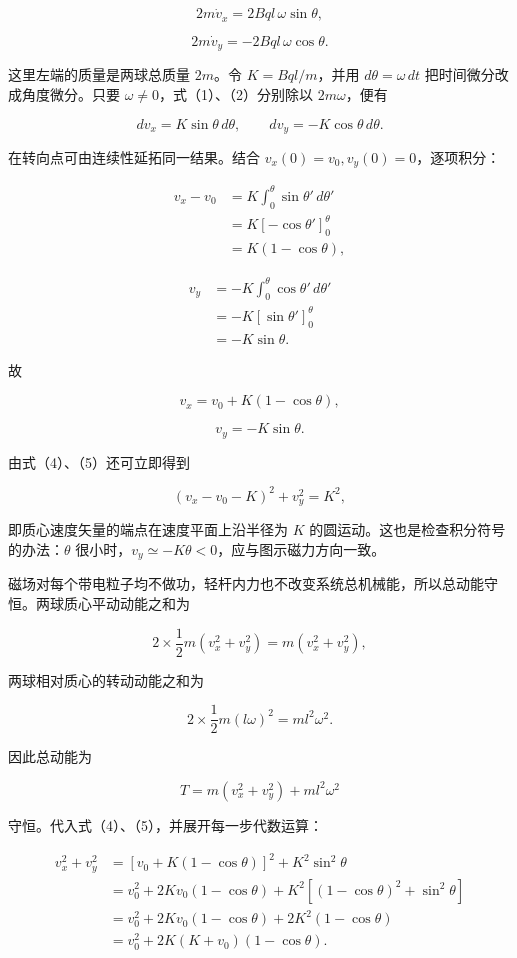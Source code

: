 \documentclass[12pt,a4paper,UTF8]{ctexart}
\begin{document}
\[
2m\dot v_x=2Bql\,\omega\sin\theta,
\tag{1}
\]

\[
2m\dot v_y=-2Bql\,\omega\cos\theta.
\tag{2}
\]

这里左端的质量是两球总质量 \(2m\)。令 \(K=Bql/m\)，并用
\(d\theta=\omega\,dt\) 把时间微分改成角度微分。只要
\(\omega\ne0\)，式（1）、（2）分别除以 \(2m\omega\)，便有

\[
dv_x=K\sin\theta\,d\theta,
\qquad
dv_y=-K\cos\theta\,d\theta.
\tag{3}
\]

在转向点可由连续性延拓同一结果。结合 \(v_x(0)=v_0,v_y(0)=0\)，逐项积分：

\[
\begin{aligned}
v_x-v_0
&=K\int_0^\theta\sin\theta'\,d\theta'\\
&=K[-\cos\theta']_0^\theta\\
&=K(1-\cos\theta),
\end{aligned}
\]

\[
\begin{aligned}
v_y
&=-K\int_0^\theta\cos\theta'\,d\theta'\\
&=-K[\sin\theta']_0^\theta\\
&=-K\sin\theta.
\end{aligned}
\]

故

\[
\boxed{v_x=v_0+K(1-\cos\theta)},
\tag{4}
\]

\[
\boxed{v_y=-K\sin\theta}.
\tag{5}
\]

由式（4）、（5）还可立即得到

\[
(v_x-v_0-K)^2+v_y^2=K^2,
\]

即质心速度矢量的端点在速度平面上沿半径为 \(K\)
的圆运动。这也是检查积分符号的办法：\(\theta\)
很小时，\(v_y\simeq-K\theta<0\)，应与图示磁力方向一致。

磁场对每个带电粒子均不做功，轻杆内力也不改变系统总机械能，所以总动能守恒。两球质心平动动能之和为

\[
2\times\frac12m(v_x^2+v_y^2)=m(v_x^2+v_y^2),
\]

两球相对质心的转动动能之和为

\[
2\times\frac12m(l\omega)^2=ml^2\omega^2.
\]

因此总动能为

\[
T=m(v_x^2+v_y^2)+ml^2\omega^2
\tag{6}
\]

守恒。代入式（4）、（5），并展开每一步代数运算：

\[
\begin{aligned}
v_x^2+v_y^2
&=[v_0+K(1-\cos\theta)]^2+K^2\sin^2\theta\\
&=v_0^2+2Kv_0(1-\cos\theta)
  +K^2[(1-\cos\theta)^2+\sin^2\theta]\\
&=v_0^2+2Kv_0(1-\cos\theta)+2K^2(1-\cos\theta)\\
&=v_0^2+2K(K+v_0)(1-\cos\theta).
\end{aligned}
\tag{7}
\]
\end{document}

